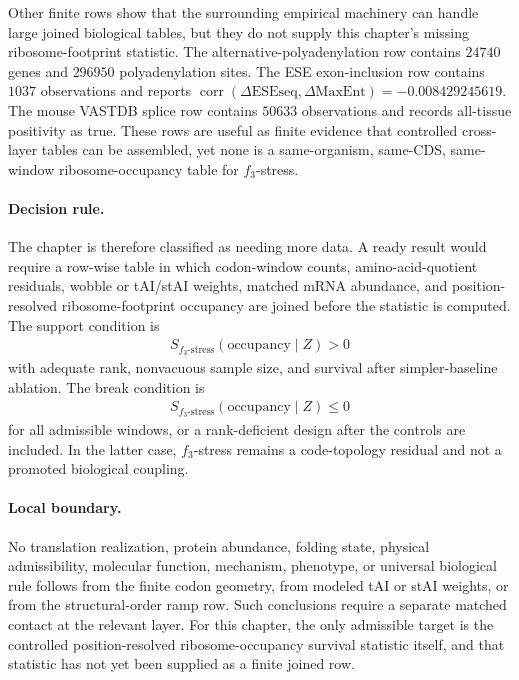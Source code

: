 Other finite rows show that the surrounding empirical machinery can handle large joined biological tables, but they do not supply this chapter's missing ribosome-footprint statistic. The alternative-polyadenylation row contains $24740$ genes and $296950$ polyadenylation sites. The ESE exon-inclusion row contains $1037$ observations and reports $\operatorname{corr}(\Delta\mathrm{ESEseq},\Delta\mathrm{MaxEnt})=-0.008429245619$. The mouse VASTDB splice row contains $50633$ observations and records all-tissue positivity as true. These rows are useful as finite evidence that controlled cross-layer tables can be assembled, yet none is a same-organism, same-CDS, same-window ribosome-occupancy table for $f_3$-stress.

\paragraph{Decision rule.}
The chapter is therefore classified as needing more data. A ready result would require a row-wise table in which codon-window counts, amino-acid-quotient residuals, wobble or tAI/stAI weights, matched mRNA abundance, and position-resolved ribosome-footprint occupancy are joined before the statistic is computed. The support condition is
$$
\begin{aligned}
S_{f_3\text{-stress}}(\mathrm{occupancy}\mid Z)>0
\end{aligned}
$$
with adequate rank, nonvacuous sample size, and survival after simpler-baseline ablation. The break condition is
$$
\begin{aligned}
S_{f_3\text{-stress}}(\mathrm{occupancy}\mid Z)\leq 0
\end{aligned}
$$
for all admissible windows, or a rank-deficient design after the controls are included. In the latter case, $f_3$-stress remains a code-topology residual and not a promoted biological coupling.

\paragraph{Local boundary.}
No translation realization, protein abundance, folding state, physical admissibility, molecular function, mechanism, phenotype, or universal biological rule follows from the finite codon geometry, from modeled tAI or stAI weights, or from the structural-order ramp row. Such conclusions require a separate matched contact at the relevant layer. For this chapter, the only admissible target is the controlled position-resolved ribosome-occupancy survival statistic itself, and that statistic has not yet been supplied as a finite joined row.

